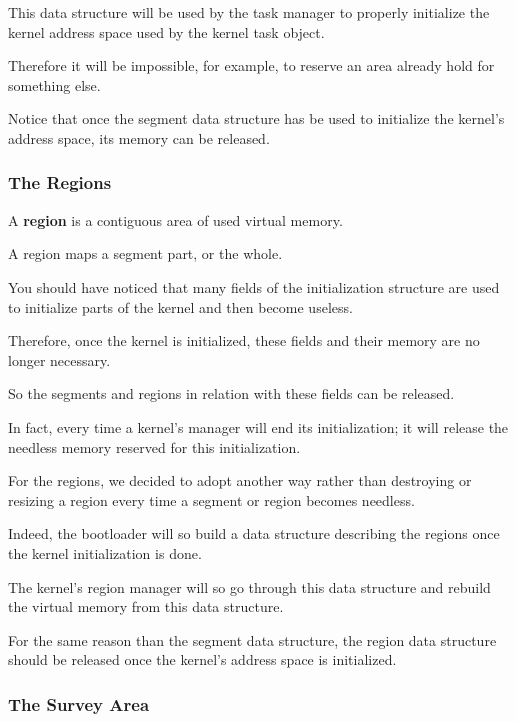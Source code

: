 This data structure will be used by the task manager to properly
initialize the kernel address space used by the kernel task object.

Therefore it will be impossible, for example, to reserve an area
already hold for something else.

Notice that once the segment data structure has be used to initialize
the kernel's address space, its memory can be released.

\subsubsection{The Regions}

A \textbf{region} is a contiguous area of used virtual memory.

A region maps a segment part, or the whole.

You should have noticed that many fields of the initialization structure
are used to initialize parts of the kernel and then become useless.

Therefore, once the kernel is initialized, these fields and their memory
are no longer necessary.

So the segments and regions in relation with these fields can be released.

In fact, every time a kernel's manager will end its initialization; it will
release the needless memory reserved for this initialization.

For the regions, we decided to adopt another way rather than destroying
or resizing a region every time a segment or region becomes needless.

Indeed, the bootloader will so build a data structure describing the regions
once the kernel initialization is done.

The kernel's region manager will so go through this data structure and
rebuild the virtual memory from this data structure.

For the same reason than the segment data structure, the region data
structure should be released once the kernel's address space is
initialized.

\subsubsection{The Survey Area}


\newpage


